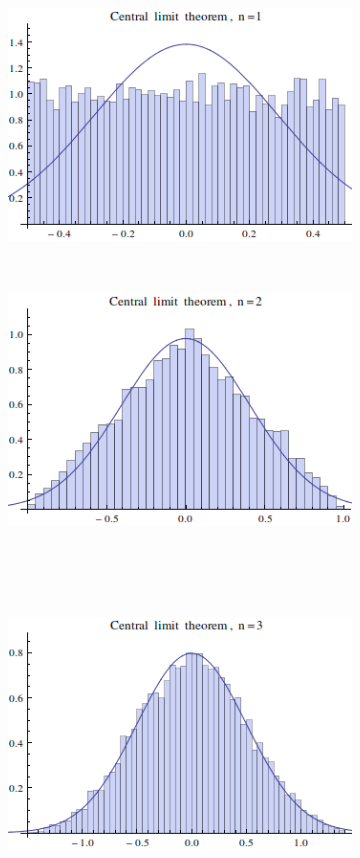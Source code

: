 \documentclass[12pt]{article}
\begin{document}
\begin{figure}[!htb]
\centering
\begin{subfigure}[b]{0.4\textwidth}
\includegraphics[scale=0.4]{central1}
\end{subfigure}
~~~
\begin{subfigure}[b]{0.4\textwidth}
\includegraphics[scale=0.4]{central2}
\end{subfigure}
\\~\\~
\begin{subfigure}[b]{0.4\textwidth}
\includegraphics[scale=0.4]{central3}
\end{subfigure}
~~~
\begin{subfigure}[b]{0.4\textwidth}

\end{subfigure}
\end{figure}
\end{document}
